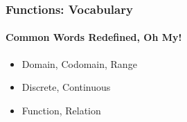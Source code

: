 \begin{frame}
\frametitle{Functions: Vocabulary}
\framesubtitle{Common Words Redefined, Oh My!}
\label{slide:functions-02-vocab}
\begin{itemize}
\item Domain, Codomain, Range
\item Discrete, Continuous
\item Function, Relation
\end{itemize}
\end{frame}
